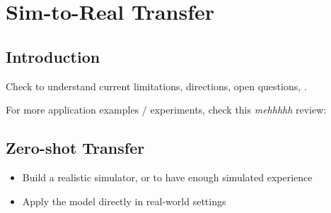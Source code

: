 \chapter{Sim-to-Real Transfer}

\section{Introduction}
Check \textit{} \cite{hofer2020perspectives} to understand current limitations, directions, open questions, \etc.

For more application examples / experiments, check this \textit{mehhhhh} review: \textit{} \cite{zhao2020sim}

\section{Zero-shot Transfer}
\begin{itemize}
	\item Build a realistic simulator, or to have enough simulated experience
	\item Apply the model directly in real-world settings
\end{itemize}

